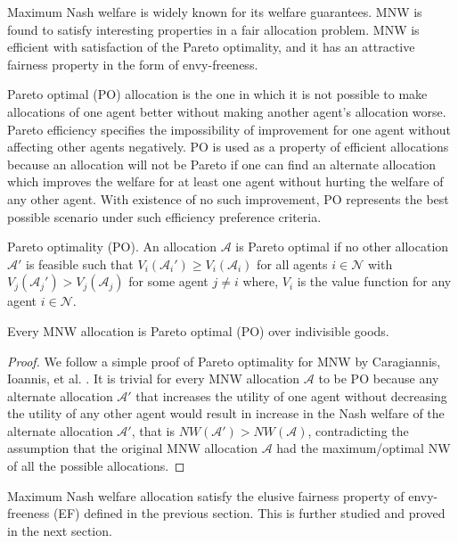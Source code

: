 Maximum Nash welfare is widely known for its welfare guarantees. MNW is found to satisfy interesting properties in a fair allocation problem. MNW is efficient with satisfaction of the Pareto optimality, and it has an attractive fairness property in the form of envy-freeness.

Pareto optimal (PO) allocation is the one in which it is not possible to make allocations of one agent better without making another agent's allocation worse. Pareto efficiency specifies the impossibility of improvement for one agent without affecting other agents negatively. PO is used as a property of efficient allocations because an allocation will not be Pareto if one can find an alternate allocation which improves the welfare for at least one agent without hurting the welfare of any other agent. With existence of no such improvement, PO represents the best possible scenario under such efficiency preference criteria.

\begin{definition}{Pareto optimality (PO).}
An allocation $\mathcal{A}$ is Pareto optimal if no other allocation $\mathcal{A'}$ is feasible such that $V_i(\mathcal{A}_i') \geq V_i(\mathcal{A}_i)$ for all agents $i \in \mathcal{N}$ with $ V_j(\mathcal{A}_j') > V_j(\mathcal{A}_j)$ for some agent $j \neq i$ where, $V_i$ is the value function for any agent $i \in \mathcal{N}$.
\end{definition}

\begin{theorem}
Every MNW allocation is Pareto optimal (PO) over indivisible goods.
\end{theorem}

\begin{proof}
We follow a simple proof of Pareto optimality for MNW by Caragiannis, Ioannis, et al. \cite{caragiannis2016unreasonable}. It is trivial for every MNW allocation $\mathcal{A}$ to be PO because any alternate allocation $\mathcal{A}'$ that increases the utility of one agent without decreasing the utility of any other agent would result in increase in the Nash welfare of the alternate allocation $\mathcal{A}'$, that is $NW(\mathcal{A}') > NW(\mathcal{A})$, contradicting the assumption that the original MNW allocation $\mathcal{A}$ had the maximum/optimal NW of all the possible allocations. 
\end{proof}

Maximum Nash welfare allocation satisfy the elusive fairness property of envy-freeness (EF) defined in the previous section. This is further studied and proved in the next section.

